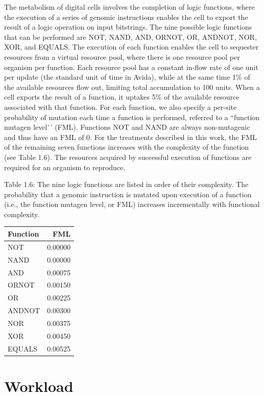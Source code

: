 \documentclass[
]{book}
\begin{document}
The metabolism of digital cells involves the completion of logic functions, where the execution of a series of genomic instructions enables the cell to export the result of a logic operation on input bitstrings. The nine possible logic functions that can be performed are NOT, NAND, AND, ORNOT, OR, ANDNOT, NOR, XOR, and EQUALS. The execution of each function enables the cell to sequester resources from a virtual resource pool, where there is one resource pool per organism per function. Each resource pool has a constant in-flow rate of one unit per update (the standard unit of time in Avida), while at the same time 1\% of the available resources flow out, limiting total accumulation to 100 units. When a cell exports the result of a function, it uptakes 5\% of the available resource associated with that function. For each function, we also specify a per-site probability of mutation each time a function is performed, referred to a ``function mutagen level'\,' (FML). Functions NOT and NAND are always non-mutagenic and thus have an FML of 0. For the treatments described in this work, the FML of the remaining seven functions increases with the complexity of the function (see Table 1.6). The resources acquired by successful execution of functions are required for an organism to reproduce.

Table 1.6: The nine logic functions are listed in order of their complexity. The probability that a genomic instruction is mutated upon execution of a function (i.e., the function mutagen level, or FML) increases incrementally with functional complexity.

\begin{table}
\centering
\begin{tabular}{lr}
\toprule
Function & FML\\
\midrule
NOT & 0.00000\\
NAND & 0.00000\\
AND & 0.00075\\
ORNOT & 0.00150\\
OR & 0.00225\\
\addlinespace
ANDNOT & 0.00300\\
NOR & 0.00375\\
XOR & 0.00450\\
EQUALS & 0.00525\\
\bottomrule
\end{tabular}
\end{table}

\hypertarget{workload}{%
\section{Workload}\label{workload}}
\end{document}

